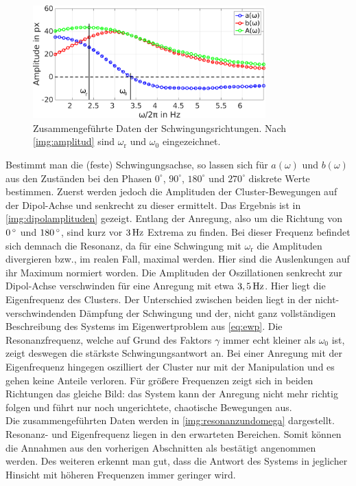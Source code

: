 \documentclass[numbers=noenddot,a4paper,notitlepage,twoside,BCOR15mm]{scrbook}
\newcommand{\degree}{^\circ}
\newcommand{\ix}[1]{_\text{#1}}
\begin{document}
						\begin{figure}[!b]
							\centering
							\includegraphics[width=0.8\textwidth,height=0.4\textwidth]{figs/auswertung/phasen/dipolphasenaufg.png}
							\caption{Zusammengeführte Daten der Schwingungsrichtungen. Nach \autoref{img:amplitud} sind $\omega\ix{r}$ und $\omega\ix{0}$ eingezeichnet.}\label{img:resonanzundomega}
						\end{figure}

						Bestimmt man die (feste) Schwingungsachse, so lassen sich für $a\left(\omega\right)$ und $b\left(\omega\right)$ aus den Zuständen bei den Phasen $0\degree$, $90\degree$, $180\degree$ und $270\degree$ diskrete Werte bestimmen. Zuerst werden jedoch die Amplituden der Cluster-Bewegungen auf der Dipol-Achse und senkrecht zu dieser ermittelt. Das Ergebnis ist in \autoref{img:dipolamplituden} gezeigt. Entlang der Anregung, also um die Richtung von $\unit[0]{\degree}$ und $\unit[180]{\degree}$, sind kurz vor $\unit[3]{Hz}$ Extrema zu finden. Bei dieser Frequenz befindet sich demnach die Resonanz, da für eine Schwingung mit $\omega\ix{r}$ die Amplituden divergieren bzw., im realen Fall, maximal werden. Hier sind die Auslenkungen auf ihr Maximum normiert worden. Die Amplituden der Oszillationen senkrecht zur Dipol-Achse verschwinden für eine Anregung mit etwa $\unit[3,5]{Hz}$. Hier liegt die Eigenfrequenz des Clusters. Der Unterschied zwischen beiden liegt in der nicht-verschwindenden Dämpfung der Schwingung und der, nicht ganz vollständigen Beschreibung des Systems im Eigenwertproblem aus \autoref{eq:ewp}. Die Resonanzfrequenz, welche auf Grund des Faktors $\gamma$ immer echt kleiner als $\omega\ix{0}$ ist, zeigt deswegen die stärkste Schwingungsantwort an. Bei einer Anregung mit der Eigenfrequenz hingegen oszilliert der Cluster nur mit der Manipulation und es gehen keine Anteile verloren. Für größere Frequenzen zeigt sich in beiden Richtungen das gleiche Bild: das System kann der Anregung nicht mehr richtig folgen und führt nur noch ungerichtete, chaotische Bewegungen aus.\\
						Die zusammengeführten Daten werden in \autoref{img:resonanzundomega} dargestellt. Resonanz- und Eigenfrequenz liegen in den erwarteten Bereichen. Somit können die Annahmen aus den vorherigen Abschnitten als bestätigt angenommen werden. Des weiteren erkennt man gut, dass die Antwort des Systems in jeglicher Hinsicht mit höheren Frequenzen immer geringer wird.
\end{document}
